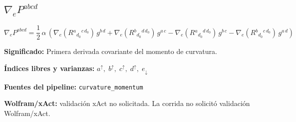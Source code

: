 \documentclass[11pt]{article}
\begin{document}
\subsection*{$ \nabla_e P^{abcd} $}
\begin{dmath*}[breakdepth={5}]
\nabla_e P^{abcd} = \frac{1}{2}\,\alpha\,\left(\nabla_{e}\!\left(R{}^{a}{}_{d_{0}}{}^{c\,d_{0}}\right)\,g{}^{b\,d} + \nabla_{e}\!\left(R{}^{b}{}_{d_{0}}{}^{d\,d_{0}}\right)\,g{}^{a\,c} - \nabla_{e}\!\left(R{}^{a}{}_{d_{0}}{}^{d\,d_{0}}\right)\,g{}^{b\,c} - \nabla_{e}\!\left(R{}^{b}{}_{d_{0}}{}^{c\,d_{0}}\right)\,g{}^{a\,d}\right)
\end{dmath*}
\par\vspace{1.2\baselineskip}\noindent
\begin{minipage}{\linewidth}
\textbf{Significado:} Primera derivada covariante del momento de curvatura.\par
\textbf{Índices libres y varianzas:} $ a^{\uparrow},\;b^{\uparrow},\;c^{\uparrow},\;d^{\uparrow},\;e_{\downarrow} $\par
\textbf{Fuentes del pipeline:} \texttt{curvature\_momentum}\par
\textbf{Wolfram/xAct:} validación xAct no solicitada. La corrida no solicitó validación Wolfram/xAct.\par
\end{minipage}
\end{document}
